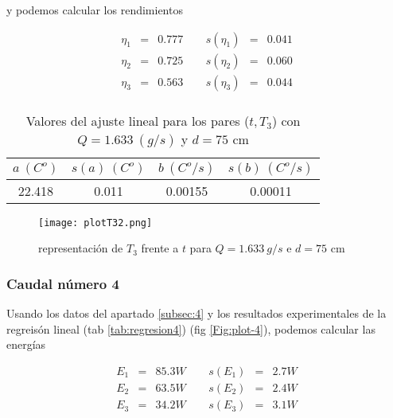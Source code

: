 \documentclass[12pt,a4paper]{article}
\begin{document}
 y podemos calcular los rendimientos 
 
\begin{equation} 
\begin{array}{lllllll}
\eta_1 & = & 0.777  &  \ \ &  s(\eta_1) & =  & 0.041   \\ 
 \eta_2 & = & 0.725  &  \ \ &  s(\eta_2) & =  & 0.060   \\ 
 \eta_3 & = & 0.563  &  \ \ &  s(\eta_3) & =  & 0.044   \\ 
 \end{array} 
\end{equation} 
 
 \begin{table}[h!] 	 \centering 
\begin{tabular}{|c|c|c|c|} 
\hline 
$a \ (C^o)$ & $s(a) \ (C^o)$ & $ b \ (C^o/s)$ & $s(b) \ (C^o/s)$  \\ \hline 
22.418  & 0.011 &  0.00155 & 0.00011 \\ 
\hline
\end{tabular} 
\caption{Valores del ajuste lineal para los pares ($t,T_3$) con $Q=1.633 \ (g/s)$ y $d= 75 $ cm} 
\label{tab:regresion3} 
\end{table} 
 
 
\begin{figure}[h!] 	 \centering 
\texttt{[image: plotT32.png]} 
\caption{representación de $T_3$ frente a $t$ para $Q = 1.633 \ g/s$ e $d = 75$ cm} 
\label{Fig:plot-3}  
\end{figure} 
 
\newpage 
 
 
 
 
\subsubsection{Caudal número 4} 
 
Usando los datos del apartado \ref{subsec:4} y los  resultados experimentales de la regreisón lineal (tab \ref{tab:regresion4}) (fig \ref{Fig:plot-4}), podemos calcular las energías 
 
 \begin{equation} 
\begin{array}{lllllll}
E_1 & = & 85.3 W &  \ \ &  s(E_1) & =  & 2.7  W \\ 
 E_2 & = & 63.5 W &  \ \ &  s(E_2) & =  & 2.4  W \\ 
 E_3 & = & 34.2 W &  \ \ &  s(E_3) & =  & 3.1  W \\ 
 \end{array} 
\end{equation} 
 
\end{document}
